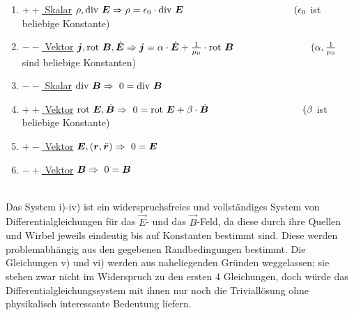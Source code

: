 \begin{enumerate}
\item
\underline{$++$ Skalar} \quad $\rho,\div \vec{E}\\
\\
\Rightarrow \rho = \epsilon_0 \cdot \div\vec{E} \hspace{4cm}  (\epsilon_0$  ist beliebige Konstante)

\item
\underline{$--$ Vektor} \quad $\vec{j}, \rot \vec{B},\dot{\vec{E}}\\
\\
\Rightarrow \vec{j} = \alpha\cdot\dot{\vec{E}} + \frac{1}{\mu_0}\cdot\rot \vec{B} \hspace{2.8cm} (\alpha,\frac{1}{\mu_0}$ sind beliebige Konstanten)

\item
\underline{$--$ Skalar} \quad $\div \vec{B}\\ 
\\
\Rightarrow \ 0 = \div \vec{B}$

\item
\underline{$++$ Vektor} \quad $\rot\vec{E},\dot{\vec{B}}\\
\\
\Rightarrow \ 0 = \rot \vec{E} + \beta\cdot\dot{\vec{B}} \hspace{3.4cm}(\beta$  ist beliebige Konstante)\qquad
\newpage

\item
\underline{$+-$ Vektor}  \quad $\vec{E},(\vec{r},\ddot{\vec{r}})\\
\\
\Rightarrow \ 0 =  \vec{E}$

\item
\underline{$-+$ Vektor} \quad $\vec{B}\\
\\
\Rightarrow \ 0 = \vec{B}$
\end{enumerate}
\ \\

Das System i)-iv) ist ein widerspruchsfreies und vollständiges System von Differentialgleichungen für das $\vec{E}$- und das $\vec{B}$-Feld, da diese durch ihre Quellen und Wirbel jeweils eindeutig bis auf Konstanten bestimmt sind. Diese werden problemabhängig aus den gegebenen Randbedingungen bestimmt. Die Gleichungen v) und vi) werden aus naheliegenden Gründen weggelassen; sie stehen zwar nicht im Widerspruch zu den ersten 4 Gleichungen, doch würde das Differentialgleichungssystem mit ihnen nur noch die Triviallösung ohne physikalisch interessante Bedeutung liefern.\\
\ \\

